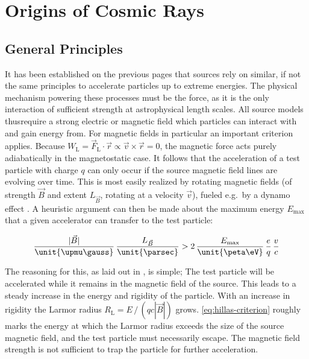 \newpage
\section{Origins of Cosmic Rays}
\label{sec:cr-accelerators}

\halflift

\subsection{General Principles}
\label{ssec:hillas-criterion}

It has been established on the previous pages that \CR sources rely on similar,
if not the same principles to accelerate particles up to extreme energies. The
physical mechanism powering these processes must be the \EM force, as it is the
only interaction of sufficient strength at astrophysical length scales. All 
\CR source models thusrequire a strong electric or magnetic field which 
particles can interact with and gain energy from. For magnetic fields in 
particular an important criterion applies. Because 
$W_\mathrm{L}=\vec{F}_\mathrm{L}\cdot\vec{r}\propto\vec{v}\times\vec{r} = 0$, 
the magnetic force acts purely adiabatically in the magnetostatic case. It 
follows that the acceleration of a test particle with charge $q$ can only occur 
if the source magnetic field lines are evolving over time. This is most easily 
realized by rotating magnetic fields (of strength $\vec{B}$ and extent 
$L_{\vec{B}}$, rotating at a velocity $\vec{v}$), fueled e.g.\ by a dynamo 
effect \cite{straussDynamoEffectFusion1985}. A heuristic argument can then be 
made about the maximum energy $E_\mathrm{max}$ that a given accelerator can 
transfer to the test particle:

\begin{equation}
\label{eq:hillas-criterion}
\frac{|\vec{B}|}{\unit{\upmu\gauss}}\,\frac{L_{\vec{B}}}{\unit{\parsec}} > 2\,\frac{E_\mathrm{max}}{\unit{\peta\eV}}\,\frac{e}{q}\,\frac{v}{c}   
\end{equation}

The reasoning for this, as laid out in 
\cite{hillasOriginUltraHighEnergyCosmic1984}, is simple; The test particle will
be accelerated while it remains in the magnetic field of the source. This leads
to a steady increase in the energy and rigidity of the particle. With an
increase in rigidity the Larmor radius $R_\mathrm{L} = E\,/\,(qc|\vec{B}|)$
grows. \cref{eq:hillas-criterion} roughly marks the energy at which the Larmor 
radius exceeds the size of the source magnetic field, and the test particle 
must necessarily escape. The magnetic field strength is not sufficient to trap 
the particle for further acceleration.

